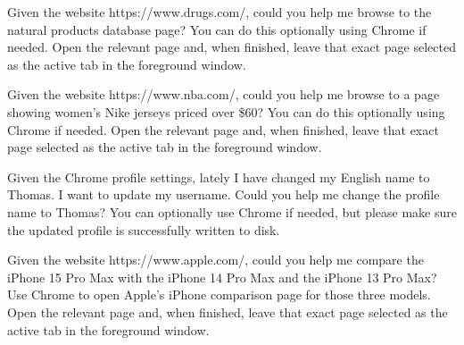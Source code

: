 \documentclass{llmxive}
\begin{document}
\begin{instructionbox}
Given the website \textasciigrave{}https://www.drugs.com/\textasciigrave{}, could you help me browse to the natural products database page? You can do this optionally using Chrome if needed. Open the relevant page and, when finished, leave that exact page selected as the active tab in the foreground window.
\end{instructionbox}

\begin{instructionbox}
Given the website \textasciigrave{}https://www.nba.com/\textasciigrave{}, could you help me browse to a page showing women's Nike jerseys priced over \$60? You can do this optionally using Chrome if needed. Open the relevant page and, when finished, leave that exact page selected as the active tab in the foreground window.
\end{instructionbox}

\begin{instructionbox}
Given the Chrome profile settings, lately I have changed my English name to Thomas. I want to update my username. Could you help me change the profile name to \textasciigrave{}Thomas\textasciigrave{}? You can optionally use Chrome if needed, but please make sure the updated profile is successfully written to disk.
\end{instructionbox}

\begin{instructionbox}
Given the website \textasciigrave{}https://www.apple.com/\textasciigrave{}, could you help me compare the iPhone 15 Pro Max with the iPhone 14 Pro Max and the iPhone 13 Pro Max? Use Chrome to open Apple's iPhone comparison page for those three models. Open the relevant page and, when finished, leave that exact page selected as the active tab in the foreground window.
\end{instructionbox}
\end{document}
